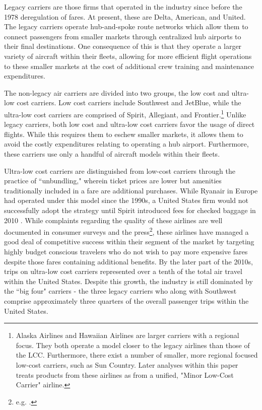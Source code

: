 \documentclass{article}
\begin{document}
	Legacy carriers are those firms that operated in the industry since before the 1978 deregulation of fares. At present, these are Delta, American, and United. The legacy carriers operate hub-and-spoke route networks which allow them to connect passengers from smaller markets through centralized hub airports to their final destinations. One consequence of this is that they operate a larger variety of aircraft within their fleets, allowing for more efficient flight operations to these smaller markets at the cost of additional crew training and maintenance expenditures.   
	
	The non-legacy air carriers are divided into two groups, the low cost and ultra-low cost carriers. Low cost carriers include Southwest and JetBlue, while the ultra-low cost carriers are comprised of Spirit, Allegiant, and Frontier.\footnote{Alaska Airlines and Hawaiian Airlines are larger carriers with a regional focus. They both operate a model closer to the legacy airlines than those of the LCC. Furthermore, there exist a number of smaller, more regional focused low-cost carriers, such as Sun Country. Later analyses within this paper treats products from these airlines as from a unified, "Minor Low-Cost Carrier" airline.} Unlike legacy carriers, both low cost and ultra-low cost carriers favor the usage of direct flights. While this requires them to eschew smaller markets, it allows them to avoid the costly expenditures relating to operating a hub airport. Furthermore, these carriers use only a handful of aircraft models within their fleets.

	Ultra-low cost carriers are distinguished from low-cost carriers through the practice of ``unbundling," wherein ticket prices are lower but amenities traditionally included in a fare are additional purchases. While Ryanair in Europe had operated under this model since the 1990s, a United States firm would not successfully adopt the strategy until Spirit introduced fees for checked baggage in 2010 \citep{bachwich_emergence_2017}. While complaints regarding the quality of these airlines are well documented in consumer surveys and the press\footnote{e.g. \citet{vasel_spirit_2016, elliott_jetblue_2022}.}, these airlines have managed a good deal of competitive success within their segment of the market by targeting highly budget conscious travelers who do not wish to pay more expensive fares despite those fares containing additional benefits. By the later part of the 2010s, trips on ultra-low cost carriers represented over a tenth of the total air travel within the United States.  Despite this growth, the industry is still dominated by the ``big four" carriers - the three legacy carriers who along with Southwest comprise approximately three quarters of the overall passenger trips within the United States. 
\end{document}
